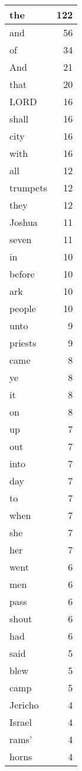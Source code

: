 \begin{center}
\begin{longtable}{l|r}
\hline \hline
\endlastfoot
the & 122 \\ \hline
and & 56 \\ \hline
of & 34 \\ \hline
And & 21 \\ \hline
that & 20 \\ \hline
LORD & 16 \\ \hline
shall & 16 \\ \hline
city & 16 \\ \hline
with & 16 \\ \hline
all & 12 \\ \hline
trumpets & 12 \\ \hline
they & 12 \\ \hline
Joshua & 11 \\ \hline
seven & 11 \\ \hline
in & 10 \\ \hline
before & 10 \\ \hline
ark & 10 \\ \hline
people & 10 \\ \hline
unto & 9 \\ \hline
priests & 9 \\ \hline
came & 8 \\ \hline
ye & 8 \\ \hline
it & 8 \\ \hline
on & 8 \\ \hline
up & 7 \\ \hline
out & 7 \\ \hline
into & 7 \\ \hline
day & 7 \\ \hline
to & 7 \\ \hline
when & 7 \\ \hline
she & 7 \\ \hline
her & 7 \\ \hline
went & 6 \\ \hline
men & 6 \\ \hline
pass & 6 \\ \hline
shout & 6 \\ \hline
had & 6 \\ \hline
said & 5 \\ \hline
blew & 5 \\ \hline
camp & 5 \\ \hline
Jericho & 4 \\ \hline
Israel & 4 \\ \hline
rams' & 4 \\ \hline
horns & 4 \\ \hline

\end{longtable}
\end{center}
